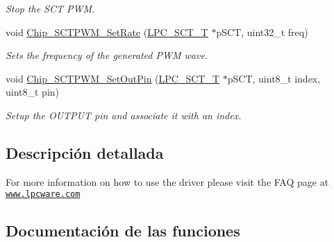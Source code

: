 \begin{DoxyCompactItemize}
\begin{DoxyCompactList}\small\item\em Stop the S\+CT P\+WM. \end{DoxyCompactList}\item 
void \hyperlink{group___s_c_t___p_w_m__18_x_x__43_x_x_gadbcc6b9f14952ee1b2f293521918755a}{Chip\+\_\+\+S\+C\+T\+P\+W\+M\+\_\+\+Set\+Rate} (\hyperlink{struct_l_p_c___s_c_t___t}{L\+P\+C\+\_\+\+S\+C\+T\+\_\+T} $\ast$p\+S\+CT, uint32\+\_\+t freq)
\begin{DoxyCompactList}\small\item\em Sets the frequency of the generated P\+WM wave. \end{DoxyCompactList}\item 
void \hyperlink{group___s_c_t___p_w_m__18_x_x__43_x_x_ga4ff891c31557e7f9b6a2ec8d8370d3c6}{Chip\+\_\+\+S\+C\+T\+P\+W\+M\+\_\+\+Set\+Out\+Pin} (\hyperlink{struct_l_p_c___s_c_t___t}{L\+P\+C\+\_\+\+S\+C\+T\+\_\+T} $\ast$p\+S\+CT, uint8\+\_\+t index, uint8\+\_\+t pin)
\begin{DoxyCompactList}\small\item\em Setup the O\+U\+T\+P\+UT pin and associate it with an index. \end{DoxyCompactList}\end{DoxyCompactItemize}


\subsection{Descripción detallada}
For more information on how to use the driver please visit the F\+AQ page at \href{http://www.lpcware.com/content/faq/how-use-sct-standard-pwm-using-lpcopen}{\tt www.\+lpcware.\+com} 

\subsection{Documentación de las funciones}
